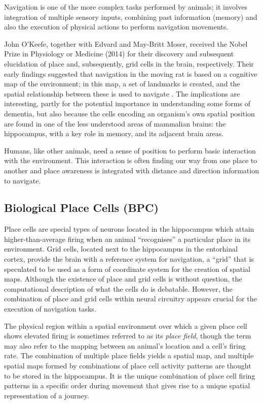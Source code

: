Navigation is one of the more complex tasks performed by animals; it involves integration of multiple sensory inputs, combining past information (memory) and also the execution of physical actions to perform navigation movements.

John O'Keefe, together with Edvard and May-Britt Moser, received the Nobel Prize in Physiology or Medicine (2014) for their discovery and subsequent elucidation of place and, subsequently, grid cells in the brain, respectively. Their early findings suggested that navigation in the moving rat is based on a cognitive map of the environment; in this map, a set of landmarks is created, and the spatial relationship between these is used to navigate \cite{keefe1978hippocampus}. The implications  are interesting, partly for the potential importance in understanding some forms of dementia, but also because the cells encoding an organism's own spatial position are found in one of the less understood areas of mammalian brains: the hippocampus, with a key role in memory, and its adjacent brain areas. 

Humans, like other animals, need a sense of position to perform basic interaction with the environment. This interaction is often finding our way from one place to another and place awareness is integrated with distance and direction information to navigate. 


\subsection{Biological Place Cells (BPC)}

Place cells are special types of neurons located in the hippocampus which attain higher-than-average firing when an animal ``recognises'' a particular place in its environment. Grid cells, located next to the hippocampus in the entorhinal cortex, provide the brain with a reference system for navigation, a ``grid'' that is speculated to be used as a form of coordinate system for the creation of spatial maps. Although the existence of place and grid cells is without question, the computational description of what the cells do is debatable. However, the combination of place and grid cells within neural circuitry appears crucial for the execution of navigation tasks.

The physical region within a spatial environment over which a given place cell shows elevated firing is sometimes referred to as its {\em place field}, though the term may also refer to the mapping between an animal's location and a cell's firing rate. The combination of multiple place fields yields a spatial map, and multiple spatial maps formed by combinations of place cell activity patterns are thought to be stored in the hippocampus. It is the unique combination of place cell firing patterns in a specific order during movement that gives rise to a unique spatial representation \cite{okeefe1971hippocampus} of a journey.



